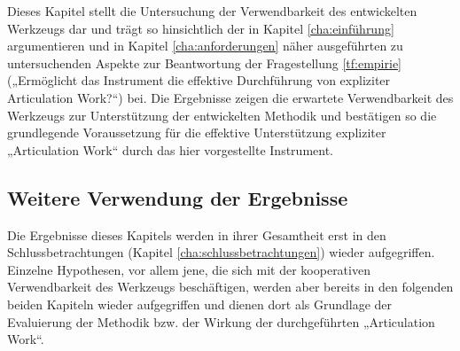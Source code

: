 Dieses Kapitel stellt die Untersuchung der Verwendbarkeit des entwickelten Werkzeugs dar und trägt so hinsichtlich der in Kapitel \ref{cha:einführung} argumentieren und in Kapitel \ref{cha:anforderungen} näher ausgeführten zu untersuchenden Aspekte zur Beantwortung der Fragestellung \ref{tf:empirie} („Ermöglicht das Instrument die effektive Durchführung von expliziter Articulation Work?“) bei. Die Ergebnisse zeigen die erwartete Verwendbarkeit des Werkzeugs zur Unterstützung der entwickelten Methodik und bestätigen so die grundlegende Voraussetzung für die effektive Unterstützung expliziter „Articulation Work“ durch das hier vorgestellte Instrument.

\subsection{Weitere Verwendung der Ergebnisse}

Die Ergebnisse dieses Kapitels werden in ihrer Gesamtheit erst in den Schlussbetrachtungen (Kapitel \ref{cha:schlussbetrachtungen}) wieder aufgegriffen. Einzelne Hypothesen, vor allem jene, die sich mit der kooperativen Verwendbarkeit des Werkzeugs beschäftigen, werden aber bereits in den folgenden beiden Kapiteln wieder aufgegriffen und dienen dort als Grundlage der Evaluierung der Methodik bzw. der Wirkung der durchgeführten „Articulation Work“.


